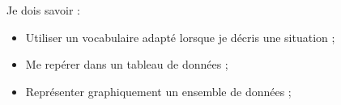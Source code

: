 
\begin{objectifs}
Je dois savoir :
\begin{itemize}[label=\textbullet]
    \item Utiliser un vocabulaire adapté lorsque je décris une situation ;
    \item Me repérer dans un tableau de données ;
    \item Représenter graphiquement un ensemble de données ;
\end{itemize}
\end{objectifs}






